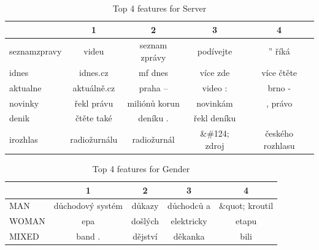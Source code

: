 \begin{table}
\centering
\caption{Top 4 features for Server}
\label{tab:top4_server}
\begin{tabular}{lcccc}
\toprule
{} &             1 &              2 &             3 &                 4 \\
\midrule
seznamzpravy &         videu &  seznam zprávy &     podívejte &            ” říká \\
idnes        &      idnes.cz &        mf dnes &      více zde &        více čtěte \\
aktualne     &   aktuálně.cz &        praha – &       video : &            brno - \\
novinky      &    řekl právu &  miliónů korun &      novinkám &           , právo \\
denik        &    čtěte také &       deníku . &   řekl deníku &                 ­ \\
irozhlas     &  radiožurnálu &    radiožurnál &  \&\#124; zdroj &  českého rozhlasu \\
\bottomrule
\end{tabular}
\end{table}

\begin{table}
\centering
\caption{Top 4 features for Gender}
\label{tab:top4_authors_cum_gender}
\begin{tabular}{lcccc}
\toprule
{} &                 1 &        2 &           3 &               4 \\
\midrule
MAN   &  důchodový systém &   důkazy &  důchodců a &  \&quot; kroutil \\
WOMAN &               epa &  došlých &  elektricky &           etapu \\
MIXED &            band . &  dějství &     děkanka &            bili \\
\bottomrule
\end{tabular}
\end{table}
